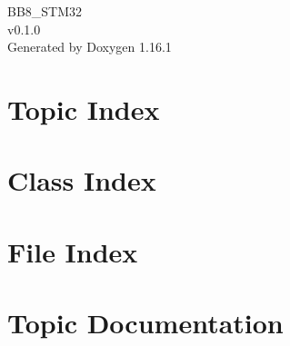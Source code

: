 \documentclass[twoside]{book}
\newcommand{\+}{\discretionary{\mbox{\scriptsize$\hookleftarrow$}}{}{}}
\newcommand{\clearemptydoublepage}{%
    \newpage{\pagestyle{empty}\cleardoublepage}%
  }
\begin{document}
  \raggedbottom
    \hypersetup{pageanchor=false,
                bookmarksnumbered=true,
                pdfencoding=unicode
               }
  \begin{titlepage}
  \vspace*{7cm}
  \begin{center}%
  {\Large BB8\+\_\+\+STM32}\\
  [1ex]\large v0.\+1.\+0 \\
  \vspace*{1cm}
  {\large Generated by Doxygen 1.16.1}\\
  \end{center}
  \end{titlepage}
  \clearemptydoublepage
  \tableofcontents
  \clearemptydoublepage
  \hypersetup{pageanchor=true}

\chapter{Topic Index}

\chapter{Class Index}

\chapter{File Index}

\chapter{Topic Documentation}


















\end{document}
